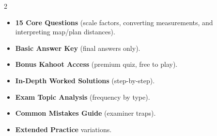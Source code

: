 \documentclass[11pt,a4paper]{article}
\newcommand{\FullReleaseDate}{April 30, 2026}
\begin{document}
\vspace{8pt}

\begin{multicols}{2}
  \begin{tcolorbox}[card, title=\sffamily\bfseries\textcolor{white}{\faHandPointDown\ TODAY (Simplified Version)}, colbacktitle=mainblue, boxed title style={sharp corners, boxrule=0pt}]
    \begin{itemize}[leftmargin=1.2em, itemsep=2pt]
      \item \small \textbf{15 Core Questions} (scale factors, converting measurements, and interpreting map/plan distances).
      \item \small \textbf{Basic Answer Key} (final answers only).
      \item \small \textbf{Bonus Kahoot Access} (premium quiz, free to play).
    \end{itemize}
  \end{tcolorbox}

  \columnbreak

  \begin{tcolorbox}[card, title=\sffamily\bfseries\textcolor{white}{\faRocket\ ON \FullReleaseDate\ (Full Upgrade)}, colbacktitle=mainblue, boxed title style={sharp corners, boxrule=0pt}]
    \begin{itemize}[leftmargin=1.2em, itemsep=2pt]
      \item \small \textbf{In-Depth Worked Solutions} (step-by-step).
      \item \small \textbf{Exam Topic Analysis} (frequency by type).
      \item \small \textbf{Common Mistakes Guide} (examiner traps).
      \item \small \textbf{Extended Practice} variations.
    \end{itemize}
  \end{tcolorbox}
\end{multicols}
\end{document}

